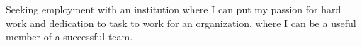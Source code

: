 
\begin{cvparagraph}

Seeking employment with an institution where I can put my passion for hard work and dedication to task to
work for an organization, where I can be a useful member of a successful team.
   

\end{cvparagraph}
